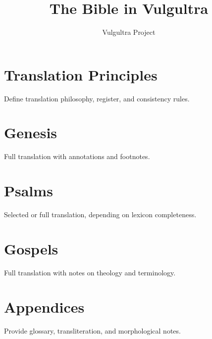 \documentclass[12pt]{book}
\title{The Bible in Vulgultra}
\author{Vulgultra Project}
\date{}
\begin{document}
\maketitle
\tableofcontents

\chapter{Translation Principles}
Define translation philosophy, register, and consistency rules.

\chapter{Genesis}
Full translation with annotations and footnotes.

\chapter{Psalms}
Selected or full translation, depending on lexicon completeness.

\chapter{Gospels}
Full translation with notes on theology and terminology.

\chapter{Appendices}
Provide glossary, transliteration, and morphological notes.
\end{document}
